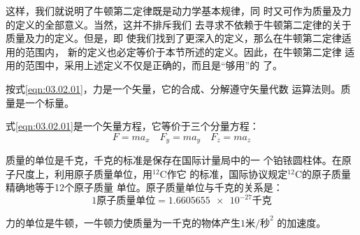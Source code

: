 { 这样，我们就说明了牛顿第二定律既是动力学基本规律，同
时又可作为质量及力的定义的全部意义。当然，这并不排斥我们
去寻求不依赖于牛顿第二定律的关于质量及力的定义。但是，即
使我们找到了更深入的定义，那么在牛顿第二定律适用的范围内，
新的定义也必定等价于本节所述的定义。因此，在牛顿第二定律
适用的范围中，采用上述定义不仅是正确的，而且是“够用”的
了。}

按式\eqref{eqn:03.02.01}，力是一个矢量，它的合成、分解遵守矢量代数
运算法则。质量是一个标量。

式\eqref{eqn:03.02.01}是一个矢量方程，它等价于三个分量方程：
\begin{equation*}
  F = m a _ { x } \quad F _ { y } = m a _ {y} \quad F _ { z } = m a_ { z }
\end{equation*}

质量的单位是千克，千克的标准是保存在国际计量局中的一
个铂铱圆柱体。在原子尺度上，利用原子质量单位，用$^{12}$C作它
的标准，国际协议规定$^{12}$C的原子质量精确地等于12个原子质量
单位。原子质量单位与千克的关系是：
\begin{equation*}
  1\text{原子质量单位} = \num{1.6605655e-27}\text{千克}
\end{equation*}

力的单位是牛顿，一牛顿力使质量为一千克的物体产生$1\text{米/秒}^2$
的加速度。